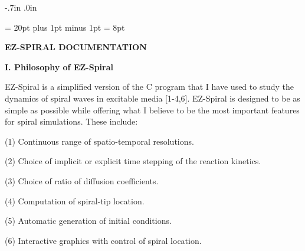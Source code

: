 % 


\textheight 9in  \textwidth 6.5in
\topmargin -.7in \oddsidemargin .0in


\baselineskip = 20pt plus 1pt minus 1pt
\parskip = 8pt
\parindent=0pt

\begin{center} 
{\bf EZ-SPIRAL DOCUMENTATION} 
\end{center} 

\bigskip
{\bf I. Philosophy of EZ-Spiral} 
\smallskip

EZ-Spiral is a simplified version of the C program that I have used to study
the dynamics of spiral waves in excitable media [1-4,6]. EZ-Spiral is designed 
to be as simple as possible while offering what I believe to be the 
most important features for spiral simulations. These include:
\begin{list}{dummy}
{\partopsep=-10pt\parsep=-10pt\itemsep=12pt}
\item[(1)] Continuous range of spatio-temporal resolutions.
\item[(2)] Choice of implicit or explicit time stepping of the reaction 
           kinetics. 
\item[(3)] Choice of ratio of diffusion coefficients.
\item[(4)] Computation of spiral-tip location.
\item[(5)] Automatic generation of initial conditions.
\item[(6)] Interactive graphics with control of spiral location.
\end{list}

